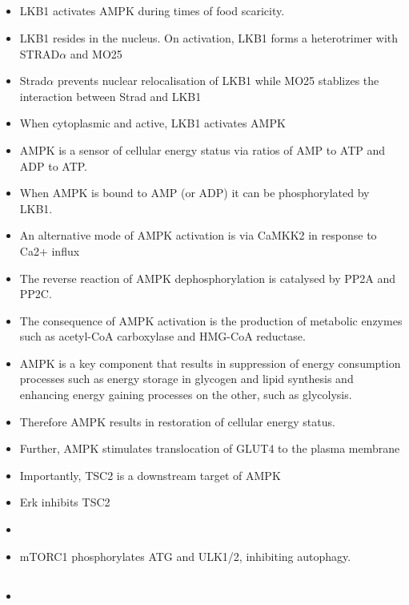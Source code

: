 \documentclass{article}
\begin{document}
    \subsection{\cite{van2011long}}
    \begin{itemize}
        \item LKB1 activates AMPK during times of food scaricity.
        \item LKB1 resides in the nucleus. On activation, LKB1 forms a heterotrimer with STRAD$\alpha$ and MO25
        \item Strad$\alpha$ prevents nuclear relocalisation of LKB1 while MO25 stablizes the interaction between Strad and LKB1
        \item When cytoplasmic and active, LKB1 activates AMPK
        \item AMPK is a sensor of cellular energy status via ratios of AMP to ATP and ADP to ATP.
        \item When AMPK is bound to AMP (or ADP) it can be phosphorylated by LKB1.
        \item An alternative mode of AMPK activation is via CaMKK2 in response to Ca2+ influx
        \item The reverse reaction of AMPK dephosphorylation is catalysed by PP2A and PP2C.
        \item The consequence of AMPK activation is the production of metabolic enzymes such as acetyl-CoA carboxylase and HMG-CoA reductase.
        \item AMPK is a key component that results in suppression of energy consumption processes such as energy storage in glycogen and lipid synthesis and enhancing energy gaining processes on the other, such as glycolysis.
        \item Therefore AMPK results in restoration of cellular energy status.
        \item Further, AMPK stimulates translocation of GLUT4 to the plasma membrane
        \item Importantly, TSC2 is a downstream target of AMPK
        \item Erk inhibits TSC2
        \item
        \item mTORC1 phosphorylates ATG and ULK1/2, inhibiting autophagy.
    \end{itemize}

    \subsection{\cite{hardie2012ampk}}
    \begin{itemize}
        \item
    \end{itemize}
\end{document}
